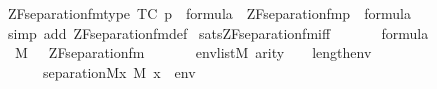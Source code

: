 \begin{isabellebody}
\ ZF{\isacharunderscore}{\kern0pt}separation{\isacharunderscore}{\kern0pt}fm{\isacharunderscore}{\kern0pt}type\ {\isacharbrackleft}{\kern0pt}TC{\isacharbrackright}{\kern0pt}{\isacharcolon}{\kern0pt}\ {\isachardoublequoteopen}p\ {\isasymin}\ formula\ {\isasymLongrightarrow}\ ZF{\isacharunderscore}{\kern0pt}separation{\isacharunderscore}{\kern0pt}fm{\isacharparenleft}{\kern0pt}p{\isacharparenright}{\kern0pt}\ {\isasymin}\ formula{\isachardoublequoteclose}\isanewline
%
\isadelimproof
\ \ %
\endisadelimproof
%
\isatagproof
{}\isamarkupfalse%
\ {\isacharparenleft}{\kern0pt}simp\ add{\isacharcolon}{\kern0pt}\ ZF{\isacharunderscore}{\kern0pt}separation{\isacharunderscore}{\kern0pt}fm{\isacharunderscore}{\kern0pt}def{\isacharparenright}{\kern0pt}%
\endisatagproof
{\isafoldproof}%
%
\isadelimproof
\isanewline
%
\endisadelimproof
\isanewline
{}\isamarkupfalse%
\ sats{\isacharunderscore}{\kern0pt}ZF{\isacharunderscore}{\kern0pt}separation{\isacharunderscore}{\kern0pt}fm{\isacharunderscore}{\kern0pt}iff{\isacharcolon}{\kern0pt}\isanewline
\ \ \isanewline
\ \ \ \ {\isachardoublequoteopen}{\isasymphi}{\isasymin}formula{\isachardoublequoteclose}\isanewline
\ \ \isanewline
\ \ {\isachardoublequoteopen}{\isacharparenleft}{\kern0pt}M{\isacharcomma}{\kern0pt}\ {\isacharbrackleft}{\kern0pt}{\isacharbrackright}{\kern0pt}\ {\isasymTurnstile}\ {\isacharparenleft}{\kern0pt}ZF{\isacharunderscore}{\kern0pt}separation{\isacharunderscore}{\kern0pt}fm{\isacharparenleft}{\kern0pt}{\isasymphi}{\isacharparenright}{\kern0pt}{\isacharparenright}{\kern0pt}{\isacharparenright}{\kern0pt}\isanewline
\ \ \ {\isasymlongleftrightarrow}\isanewline
\ \ \ {\isacharparenleft}{\kern0pt}{\isasymforall}env{\isasymin}list{\isacharparenleft}{\kern0pt}M{\isacharparenright}{\kern0pt}{\isachardot}{\kern0pt}\ arity{\isacharparenleft}{\kern0pt}{\isasymphi}{\isacharparenright}{\kern0pt}\ {\isasymle}\ {}\ {\isacharhash}{\kern0pt}{\isacharplus}{\kern0pt}\ length{\isacharparenleft}{\kern0pt}env{\isacharparenright}{\kern0pt}\ {\isasymlongrightarrow}\ \isanewline
\ \ \ \ \ \ separation{\isacharparenleft}{\kern0pt}{\isacharhash}{\kern0pt}{\isacharhash}{\kern0pt}M{\isacharcomma}{\kern0pt}{\isasymlambda}x{\isachardot}{\kern0pt}\ M{\isacharcomma}{\kern0pt}\ {\isacharbrackleft}{\kern0pt}x{\isacharbrackright}{\kern0pt}\ {\isacharat}{\kern0pt}\ env\ {\isasymTurnstile}\ {\isasymphi}{\isacharparenright}{\kern0pt}{\isacharparenright}{\kern0pt}{\isachardoublequoteclose}\isanewline
%
\isadelimproof
%
\endisadelimproof
%
\isatagproof
{}\isamarkupfalse%

\end{isabellebody}
